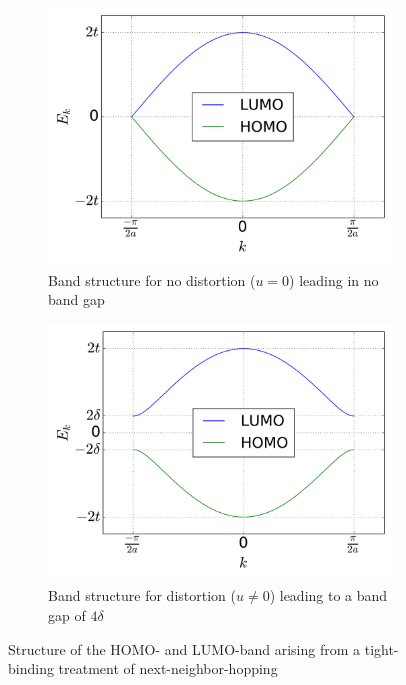 \begin{figure}
	\centering
	\begin{subfigure}{0.49\textwidth}
		\includegraphics[width =\textwidth]{Images/Plots/bandstructure_without_gap}
		\caption{Band structure for no distortion ($u = 0$) leading in no band gap}
		\label{image_bs_wo_gap}
	\end{subfigure}\hspace*{0.2cm}
	\begin{subfigure}{0.49\textwidth}
		\includegraphics[width = \textwidth]{Images/Plots/bandstructure_with_gap}
		\caption{Band structure for distortion ($u \neq 0$) leading to a band gap of $4\delta$}
		\label{image_bs_w_gap}
	\end{subfigure}
	\caption{Structure of the HOMO- and LUMO-band arising from a tight-binding treatment of next-neighbor-hopping}
	\label{images_bs}
\end{figure}
